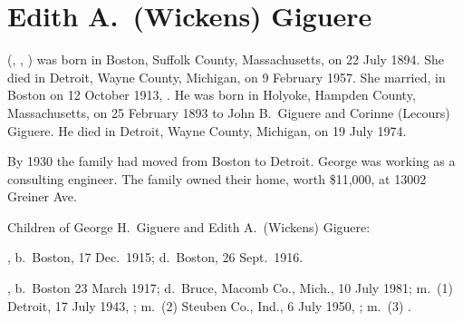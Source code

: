 \section{Edith A.\ (Wickens) Giguere}\label{per:Edith4Wickens}

 (, , ) was born in Boston, Suffolk County, Massachusetts, on 22 July 1894.\cite{Edith4WickensBirth} She died in Detroit, Wayne County, Michigan, on 9 February 1957.\cite{Edith4WickensDeath} She married, in Boston on 12 October 1913, .\cite{Edith4WickensMarriage} He was born in Holyoke, Hampden County, Massachusetts, on 25 February 1893 to John B.\ Giguere and Corinne (Lecours) Giguere.\cite{GeorgeGiguereBirth} He died in Detroit, Wayne County, Michigan, on 19 July 1974.\cite{GeorgeGiguereDeath}

By 1930 the family had moved from Boston to Detroit. George was working as a consulting engineer. The family owned their home, worth \$11,000, at 13002 Greiner Ave.\cite{Census1930GeorgeGiguere}

\begin{KidsIntro}
	Children of George H.\ Giguere and Edith A.\ (Wickens) Giguere:
\end{KidsIntro}

\begin{Kids}
	, b.\ Boston, 17 Dec.\ 1915;\cite{Robert5GiguereDeath:1} d.\ Boston, 26 Sept.\ 1916.\cite{Robert5GiguereDeath:2}
	
	, b.\ Boston 23 March 1917;\cite{JohnMeyersMarriage:1,Dorris5GiguereSSDeath} d.\ Bruce, Macomb Co., Mich., 10 July 1981;\cite{Dorris5GiguereMichiganDeath} m.\ (1) Detroit, 17 July 1943, ;\cite{RobertMayMarriage} m.\ (2) Steuben Co., Ind., 6 July 1950, ;\cite{JohnMeyersMarriage:2} m.\ (3) .\cite{Dorris5GiguereObit}
\end{Kids}